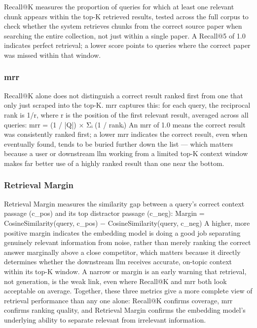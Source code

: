 Recall@K measures the proportion of queries for which at least one relevant chunk appears within the top-K retrieved results, tested across the full corpus to check whether the system retrieves chunks from the correct source paper when searching the entire collection, not just within a single paper. A Recall@5 of 1.0 indicates perfect retrieval; a lower score points to queries where the correct paper was missed within that window.

\subsubsection{\gls{mrr}}

Recall@K alone does not distinguish a correct result ranked first from one that only just scraped into the top-K. \gls{mrr} captures this: for each query, the reciprocal rank is 1/r, where r is the position of the first relevant result, averaged across all queries:
\newline \newline \gls{mrr} = (1 / |Q|) × Σᵢ (1 / rankᵢ)
\newline \newline An \gls{mrr} of 1.0 means the correct result was consistently ranked first; a lower \gls{mrr} indicates the correct result, even when eventually found, tends to be buried further down the list — which matters because a user or downstream \gls{llm} working from a limited top-K context window makes far better use of a highly ranked result than one near the bottom.

\subsubsection{Retrieval Margin}

Retrieval Margin measures the similarity gap between a query's correct context passage (c_pos) and its top distractor passage (c_neg):
\newline \newline Margin = CosineSimilarity(query, c_pos) − CosineSimilarity(query, c_neg)
\newline \newline A higher, more positive margin indicates the embedding model is doing a good job separating genuinely relevant information from noise, rather than merely ranking the correct answer marginally above a close competitor, which matters because it directly determines whether the downstream \gls{llm} receives accurate, on-topic context within its top-K window. A narrow or margin is an early warning that retrieval, not generation, is the weak link, even where Recall@K and \gls{mrr} both look acceptable on average.
\newline \newline Together, these three metrics give a more complete view of retrieval performance than any one alone: Recall@K confirms coverage, \gls{mrr} confirms ranking quality, and Retrieval Margin confirms the embedding model's underlying ability to separate relevant from irrelevant information.

